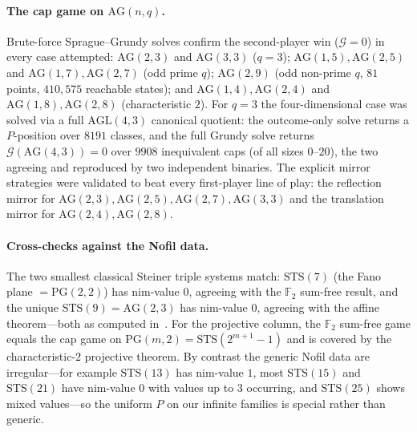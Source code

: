 \documentclass[11pt]{article}
\theoremstyle{plain}
\theoremstyle{definition}
\theoremstyle{remark}
\newcommand{\AG}{\mathrm{AG}}
\newcommand{\PG}{\mathrm{PG}}
\newcommand{\STS}{\mathrm{STS}}
\newcommand{\Grundy}{\mathcal{G}}       %
\begin{document}
\paragraph{The cap game on $\AG(n,q)$.} Brute-force Sprague--Grundy solves confirm the second-player
win ($\Grundy=0$) in every case attempted: $\AG(2,3)$ and $\AG(3,3)$ ($q=3$); $\AG(1,5),\AG(2,5)$ and
$\AG(1,7),\AG(2,7)$ (odd prime $q$); $\AG(2,9)$ (odd non-prime $q$, $81$ points, $410{,}575$ reachable
states); and $\AG(1,4),\AG(2,4)$ and $\AG(1,8),\AG(2,8)$ (characteristic $2$).
For $q=3$ the four-dimensional case was solved via a full $\mathrm{AGL}(4,3)$ canonical quotient: the
outcome-only solve returns a $P$-position over $8191$ classes, and the full Grundy solve returns
$\Grundy(\AG(4,3))=0$ over $9908$ inequivalent caps (of all sizes $0$--$20$), the two agreeing and
reproduced by two independent binaries.
The explicit mirror strategies were validated to beat every first-player line of play: the reflection
mirror for $\AG(2,3),\AG(2,5),\AG(2,7),\AG(3,3)$ and the translation mirror for $\AG(2,4),\AG(2,8)$.

\paragraph{Cross-checks against the Nofil data.} The two smallest classical Steiner triple systems
match: $\STS(7)$ (the Fano plane $=\PG(2,2)$) has nim-value $0$, agreeing with the $\mathbb{F}_2$
sum-free result, and the unique $\STS(9)=\AG(2,3)$ has nim-value $0$, agreeing with the affine
theorem---both as computed in~\cite{huggan2022nofil}. For the projective column, the
$\mathbb{F}_2$ sum-free game equals the cap game on $\PG(m,2)=\STS(2^{m+1}-1)$ and is covered by
the characteristic-$2$ projective theorem. By contrast the generic Nofil data are irregular---for
example $\STS(13)$ has
nim-value $1$, most $\STS(15)$ and $\STS(21)$ have nim-value $0$ with values up to $3$ occurring,
and $\STS(25)$ shows mixed values---so the uniform $P$ on our infinite families is special rather
than generic.
\end{document}

